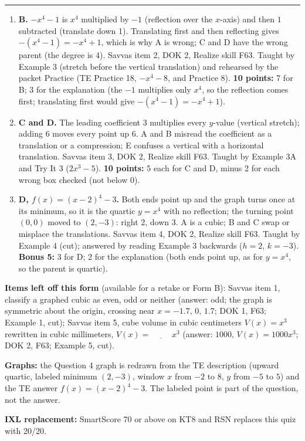 \documentclass[11pt]{article}
\begin{document}
\vspace{4pt}\noindent\rule{\textwidth}{0.6pt}

\begin{enumerate}
\item[2.] \textbf{B.} $-x^4-1$ is $x^4$ multiplied by $-1$ (reflection over the $x$-axis) and then $1$ subtracted (translate down 1). Translating first and then reflecting gives $-(x^4-1)=-x^4+1$, which is why A is wrong; C and D have the wrong parent (the degree is 4). Savvas item 2, DOK 2, Realize skill F63. Taught by Example 3 (stretch before the vertical translation) and rehearsed by the packet Practice (TE Practice 18, $-x^4-8$, and Practice 8). \textbf{10 points:} 7 for B; 3 for the explanation (the $-1$ multiplies only $x^4$, so the reflection comes first; translating first would give $-(x^4-1)=-x^4+1$).
\item[3.] \textbf{C and D.} The leading coefficient 3 multiplies every $y$-value (vertical stretch); adding 6 moves every point up 6. A and B misread the coefficient as a translation or a compression; E confuses a vertical with a horizontal translation. Savvas item 3, DOK 2, Realize skill F63. Taught by Example 3A and Try It 3 ($2x^3-5$). \textbf{10 points:} 5 each for C and D, minus 2 for each wrong box checked (not below 0).
\item[4.] \textbf{D, $f(x)=(x-2)^4-3$.} Both ends point up and the graph turns once at its minimum, so it is the quartic $y=x^4$ with no reflection; the turning point $(0,0)$ moved to $(2,-3)$: right 2, down 3. A is a cubic; B and C swap or misplace the translations. Savvas item 4, DOK 2, Realize skill F63. Taught by Example 4 (cut); answered by reading Example 3 backwards ($h=2$, $k=-3$). \textbf{Bonus 5:} 3 for D; 2 for the explanation (both ends point up, as for $y=x^4$, so the parent is quartic).
\end{enumerate}

\textbf{Items left off this form} (available for a retake or Form B): Savvas item 1, classify a graphed cubic as even, odd or neither (answer: odd; the graph is symmetric about the origin, crossing near $x=-1.7$, $0$, $1.7$; DOK 1, F63; Example 1, cut); Savvas item 5, cube volume in cubic centimeters $V(x)=x^3$ rewritten in cubic millimeters, $V(x)=\underline{\hspace{1cm}}\,x^3$ (answer: $1000$, $V(x)=1000x^3$; DOK 2, F63; Example 5, cut).

\textbf{Graphs:} the Question 4 graph is redrawn from the TE description (upward quartic, labeled minimum $(2,-3)$, window $x$ from $-2$ to $8$, $y$ from $-5$ to $5$) and the TE answer $f(x)=(x-2)^4-3$. The labeled point is part of the question, not the answer.

\textbf{IXL replacement:} SmartScore 70 or above on KT8 and RSN replaces this quiz with 20/20.
\end{document}
